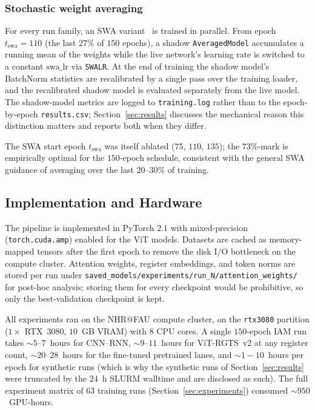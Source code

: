 \subsubsection{Stochastic weight averaging}

For every run family, an SWA variant~\cite{izmailov2018swa} is trained in parallel. From epoch $t_{\mathrm{swa}} = 110$ (the last $27\%$ of $150$ epochs), a shadow \texttt{AveragedModel} accumulates a running mean of the weights while the live network's learning rate is switched to a constant $\mathrm{swa\_lr}$ via \texttt{SWALR}. At the end of training the shadow model's BatchNorm statistics are recalibrated by a single pass over the training loader, and the recalibrated shadow model is evaluated separately from the live model. The shadow-model metrics are logged to \texttt{training.log} rather than to the epoch-by-epoch \texttt{results.csv}; Section~\ref{sec:results} discusses the mechanical reason this distinction matters and reports both when they differ.

The SWA start epoch $t_{\mathrm{swa}}$ was itself ablated ($75$, $110$, $135$); the $73\%$-mark is empirically optimal for the $150$-epoch schedule, consistent with the general SWA guidance of averaging over the last $20$--$30\%$ of training.

\subsection{Implementation and Hardware}
\label{sec:impl}

The pipeline is implemented in PyTorch $2.1$ with mixed-precision (\texttt{torch.cuda.amp}) enabled for the ViT models. Datasets are cached as memory-mapped tensors after the first epoch to remove the disk I/O bottleneck on the compute cluster. Attention weights, register embeddings, and token norms are stored per run under \texttt{saved\_models/experiments/run\_N/attention\_weights/} for post-hoc analysis; storing them for every checkpoint would be prohibitive, so only the best-validation checkpoint is kept.

All experiments ran on the NHR@FAU compute cluster, on the \texttt{rtx3080} partition ($1 \times$ RTX~3080, $10$~GB VRAM) with $8$ CPU cores. A single $150$-epoch IAM run takes ${\sim}5$--$7$~hours for CNN--RNN, ${\sim}9$--$11$~hours for ViT-RGTS~v2 at any register count, ${\sim}20$--$28$~hours for the fine-tuned pretrained lanes, and ${\sim}1{-}10$~hours per epoch for synthetic runs (which is why the synthetic runs of Section~\ref{sec:results} were truncated by the $24$~h SLURM walltime and are disclosed as such). The full experiment matrix of $63$ training runs (Section~\ref{sec:experiments}) consumed ${\sim}950$~GPU-hours.
